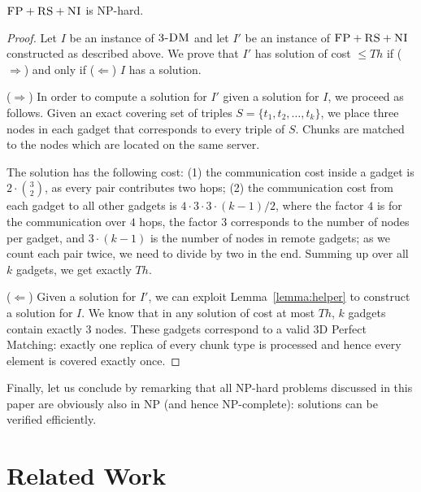 \documentclass[9pt]{sigcomm-alternate}
\newcommand{\CC}{\textsc{NI}}
\newcommand{\FP}{\textsc{FP}}
\newcommand{\RS}{\textsc{RS}}
\newcommand{\TDM}{\textsc{3-DM}}
\newcommand{\Thr}{\ensuremath{Th}}
\begin{document}
\begin{theorem}
\label{theorem:fp_rs_cc}
$\FP+\RS+\CC$ is NP-hard.
\end{theorem}
\begin{proof}
Let $I$ be an instance of $\TDM$ and let $I'$ be an instance of
$\FP+\RS+\CC$ constructed as described above.
We prove that $I'$ has solution of cost $\leq \Thr$ if ($\Rightarrow$) and only if
($\Leftarrow$)
$I$ has a solution.

($\Rightarrow$) In order to compute a solution
for $I'$ given a solution for $I$, we proceed as follows.
Given an exact covering set of triples $S = \{t_1, t_2,
\ldots, t_k\}$, we place three nodes in each gadget that
corresponds to every triple of $S$. Chunks are matched to the nodes which are located
on the same server.

The solution has the following cost:
(1) the communication cost inside a gadget is $2 \cdot {3 \choose 2}$,
  as every pair contributes two hops;
  (2) the communication cost from each gadget to all other gadgets is $4
  \cdot 3 \cdot 3 \cdot (k - 1) / 2$, where the factor $4$ is
  for the
  communication over $4$ hops, the factor $3$
  corresponds to the number of nodes per gadget, and
  $3 \cdot (k-1)$ is the number of nodes in remote gadgets;
  as we count each pair twice, we need to divide by two in the end.
Summing up over all $k$ gadgets, we get exactly $\Thr$.

($\Leftarrow$) Given a solution for $I'$,
we can exploit Lemma~\ref{lemma:helper} to construct a solution for $I$.
We know that in any solution of cost at most $\Thr$,
$k$ gadgets contain exactly 3 nodes. These gadgets correspond to a valid
3D Perfect Matching: exactly one replica of every chunk type is processed and
hence every element is covered exactly once.
\end{proof}

Finally, let us conclude by remarking that all NP-hard problems discussed in this paper
are obviously also in NP (and hence NP-complete): solutions can be verified efficiently.


\section{Related Work}\label{sec:relwork}
\end{document}
